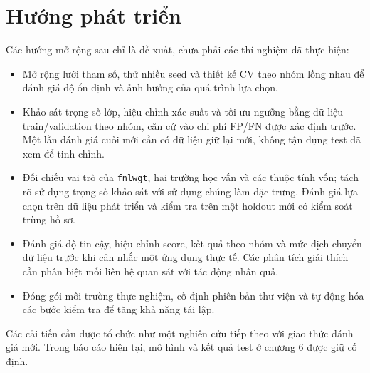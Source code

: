 \section{Hướng phát triển}
\label{sec:7_3}
Các hướng mở rộng sau chỉ là đề xuất, chưa phải các thí nghiệm đã thực hiện:
\begin{itemize}
\item Mở rộng lưới tham số, thử nhiều seed và thiết kế CV theo nhóm lồng nhau để đánh giá độ ổn định và ảnh hưởng của quá trình lựa chọn.
\item Khảo sát trọng số lớp, hiệu chỉnh xác suất và tối ưu ngưỡng bằng dữ liệu train/validation theo nhóm, căn cứ vào chi phí FP/FN được xác định trước. Một lần đánh giá cuối mới cần có dữ liệu giữ lại mới, không tận dụng test đã xem để tinh chỉnh.
\item Đối chiếu vai trò của \texttt{fnlwgt}, hai trường học vấn và các thuộc tính vốn; tách rõ sử dụng trọng số khảo sát với sử dụng chúng làm đặc trưng. Đánh giá lựa chọn trên dữ liệu phát triển và kiểm tra trên một holdout mới có kiểm soát trùng hồ sơ.
\item Đánh giá độ tin cậy, hiệu chỉnh score, kết quả theo nhóm và mức dịch chuyển dữ liệu trước khi cân nhắc một ứng dụng thực tế. Các phân tích giải thích cần phân biệt mối liên hệ quan sát với tác động nhân quả.
\item Đóng gói môi trường thực nghiệm, cố định phiên bản thư viện và tự động hóa các bước kiểm tra để tăng khả năng tái lập.
\end{itemize}
Các cải tiến cần được tổ chức như một nghiên cứu tiếp theo với giao thức đánh giá mới. Trong báo cáo hiện tại, mô hình và kết quả test ở chương 6 được giữ cố định.
